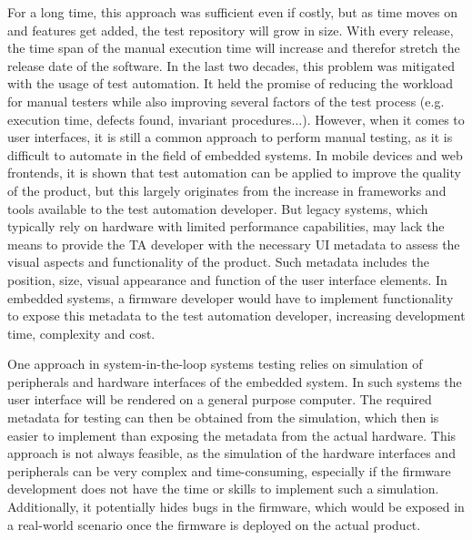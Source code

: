 \documentclass[Proposal,BIC,english,IEEE]{BASE/twbook} %
\begin{document}
For a long time, this approach was sufficient even if costly, but as time moves on and features get added, the test repository will grow in size. With every release, the time span of the manual execution time will increase and therefor stretch the release date of the software.
In the last two decades, this problem was mitigated with the usage of test automation. It held the promise of reducing the workload for manual testers while also improving several factors of the test process (e.g. execution time, defects found, invariant procedures...).
However, when it comes to user interfaces, it is still a common approach to perform manual testing, as it is difficult to automate in the field of embedded systems.
In mobile devices and web frontends, it is shown that test automation can be applied to improve the quality of the product, but this largely originates from the increase in frameworks and tools available to the test automation developer.
But legacy systems, which typically rely on hardware with limited performance capabilities, may lack the means to provide the TA developer with the necessary UI metadata to assess the visual aspects and functionality of the product. Such metadata includes the position, size, visual appearance and function of the user interface elements. In embedded systems, a firmware developer would have to implement functionality to expose this metadata to the test automation developer, increasing development time, complexity and cost.

One approach in system-in-the-loop systems testing relies on simulation of peripherals and hardware interfaces of the embedded system. In such systems the user interface will be rendered on a general purpose computer. The required metadata for testing can then be obtained from the simulation, which then is easier to implement than exposing the metadata from the actual hardware.
This approach is not always feasible, as the simulation of the hardware interfaces and peripherals can be very complex and time-consuming, especially if the firmware development does not have the time or skills to implement such a simulation. Additionally, it potentially hides bugs in the firmware, which would be exposed in a real-world scenario once the firmware is deployed on the actual product.
\end{document}
